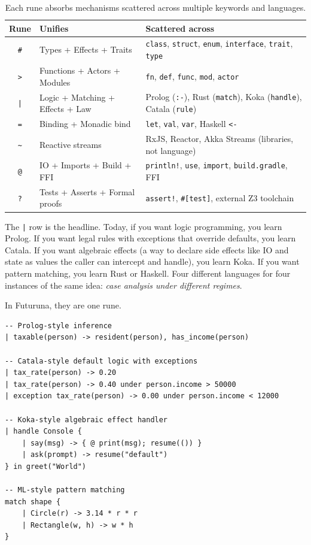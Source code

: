 \documentclass[11pt,a4paper]{article}
\begin{document}
\begin{table}[H]
\centering
\caption{Each rune absorbs mechanisms scattered across multiple keywords and languages.}
\label{tab:unifies}
\small
\begin{tabular}{clp{8cm}}
\toprule
Rune & Unifies & Scattered across \\
\midrule
\texttt{\#} & Types + Effects + Traits & \texttt{class}, \texttt{struct}, \texttt{enum}, \texttt{interface}, \texttt{trait}, \texttt{type} \\
\texttt{>} & Functions + Actors + Modules & \texttt{fn}, \texttt{def}, \texttt{func}, \texttt{mod}, \texttt{actor} \\
\texttt{|} & Logic + Matching + Effects + Law & Prolog (\texttt{:-}), Rust (\texttt{match}), Koka (\texttt{handle}), Catala (\texttt{rule}) \\
\texttt{=} & Binding + Monadic bind & \texttt{let}, \texttt{val}, \texttt{var}, Haskell \texttt{<-} \\
\texttt{\textasciitilde} & Reactive streams & RxJS, Reactor, Akka Streams (libraries, not language) \\
\texttt{@} & IO + Imports + Build + FFI & \texttt{println!}, \texttt{use}, \texttt{import}, \texttt{build.gradle}, FFI \\
\texttt{?} & Tests + Asserts + Formal proofs & \texttt{assert!}, \texttt{\#[test]}, external Z3 toolchain \\
\bottomrule
\end{tabular}
\end{table}

The \texttt{|} row is the headline. Today, if you want logic programming, you learn Prolog. If you want legal rules with exceptions that override defaults, you learn Catala. If you want algebraic effects (a way to declare side effects like IO and state as values the caller can intercept and handle), you learn Koka. If you want pattern matching, you learn Rust or Haskell. Four different languages for four instances of the same idea: \emph{case analysis under different regimes}.

In Futuruna, they are one rune.

\begin{lstlisting}
-- Prolog-style inference
| taxable(person) -> resident(person), has_income(person)

-- Catala-style default logic with exceptions
| tax_rate(person) -> 0.20
| tax_rate(person) -> 0.40 under person.income > 50000
| exception tax_rate(person) -> 0.00 under person.income < 12000

-- Koka-style algebraic effect handler
| handle Console {
    | say(msg) -> { @ print(msg); resume(()) }
    | ask(prompt) -> resume("default")
} in greet("World")

-- ML-style pattern matching
match shape {
    | Circle(r) -> 3.14 * r * r
    | Rectangle(w, h) -> w * h
}
\end{lstlisting}
\end{document}
